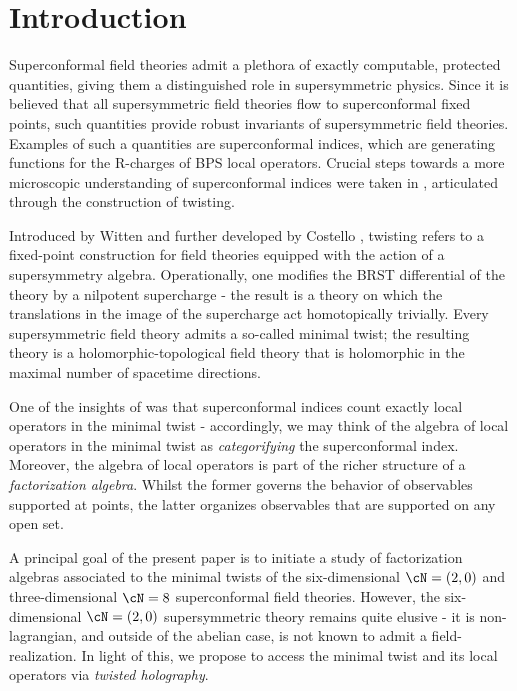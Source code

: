 %
%
%

\section{Introduction}
Superconformal field theories admit a plethora of exactly computable, protected quantities, giving them a distinguished role in supersymmetric physics. Since it is believed that all supersymmetric field theories flow to superconformal fixed points, such quantities provide robust invariants of supersymmetric field theories. Examples of such a quantities are superconformal indices, which are generating functions for the R-charges of BPS local operators. Crucial steps towards a more microscopic understanding of superconformal indices were taken in \cite{}, articulated through the construction of twisting.

Introduced by Witten \cite{} and further developed by Costello \cite{}, twisting refers to a fixed-point construction for field theories equipped with the action of a supersymmetry algebra. Operationally, one modifies the BRST differential of the theory by a nilpotent supercharge - the result is a theory on which the translations in the image of the supercharge act homotopically trivially. Every supersymmetric field theory admits a so-called minimal twist; the resulting theory is a holomorphic-topological field theory that is holomorphic in the maximal number of spacetime directions.

One of the insights of \cite{} was that superconformal indices count exactly local operators in the minimal twist - accordingly, we may think of the algebra of local operators in the minimal twist as \textit{categorifying} the superconformal index. Moreover, the algebra of local operators is part of the richer structure of a \textit{factorization algebra}. Whilst the former governs the behavior of observables supported at points, the latter organizes observables that are supported on any open set.

A principal goal of the present paper is to initiate a study of factorization algebras associated to the minimal twists of the six-dimensional $\cN=(2,0)$ and three-dimensional $\cN=8$ superconformal field theories. However, the six-dimensional $\cN=(2,0)$ supersymmetric theory remains quite elusive - it is non-lagrangian, and outside of the abelian case, is not known to admit a field-realization. In light of this, we propose to access the minimal twist and its local operators via \textit{twisted holography}.

